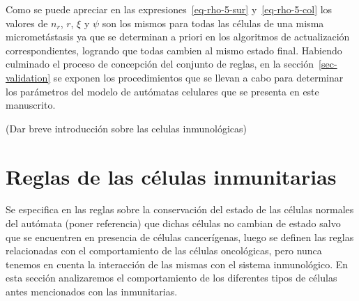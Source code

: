 Como se puede apreciar en las expresiones~\ref{eq-rho-5-sur} y~\ref{eq-rho-5-col} los valores de $n_r$, $r$, $\xi$ y $\psi$ son los mismos para todas las c\'elulas de una misma micromet\'astasis ya que se determinan a priori en los algoritmos de actualizaci\'on correspondientes, logrando que todas cambien al mismo estado final. Habiendo culminado el proceso de concepci\'on del conjunto de reglas, en la secci\'on~\ref{sec-validation} se exponen los procedimientos que se llevan a cabo para determinar los par\'ametros del modelo de aut\'omatas celulares que se presenta en este manuscrito. 


(Dar breve introducción sobre las celulas inmunológicas)








\section{Reglas de las c\'elulas inmunitarias}

Se especifica en las reglas sobre la conservaci\'on del estado de las c\'elulas normales del aut\'omata (poner referencia) que dichas c\'elulas no cambian de estado salvo que se encuentren en presencia de c\'elulas cancerígenas, luego se definen las reglas relacionadas con el comportamiento de las c\'elulas oncol\'ogicas, pero nunca tenemos en cuenta la interacci\'on de las mismas con el sistema inmunológico. En esta sección analizaremos el comportamiento de los diferentes tipos de c\'elulas antes mencionados con las inmunitarias.

